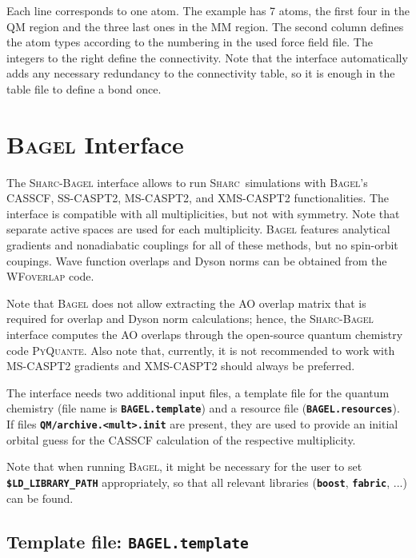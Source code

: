 \documentclass[a4paper,10pt,DIV=15,openany]{scrbook}
\newcommand{\tthdump}[1]{#1}
\newcommand{\sharc}{\textsc{Sharc}}
\newcommand{\ttt}[1]{\textbf{\texttt{#1}}}
\begin{document}
Each line corresponds to one atom.
The example has 7 atoms, the first four in the QM region and the three last ones in the MM region.
The second column defines the atom types according to the numbering in the used force field file.
The integers to the right define the connectivity. 
Note that the interface automatically adds any necessary redundancy to the connectivity table, so it is enough in the table file to define a bond once.







\tthdump{\FloatBarrier}
\section{\textsc{Bagel} Interface}\label{sec:int:bagel}

The \sharc-\textsc{Bagel} interface allows to run \sharc\ simulations with \textsc{Bagel}'s CASSCF, SS-CASPT2, MS-CASPT2, and XMS-CASPT2 functionalities.
The interface is compatible with all multiplicities, but not with symmetry.
Note that separate active spaces are used for each multiplicity.
\textsc{Bagel} features analytical gradients and nonadiabatic couplings for all of these methods, but no spin-orbit coupings.
Wave function overlaps and Dyson norms can be obtained from the \textsc{WFoverlap} code.

Note that \textsc{Bagel} does not allow extracting the AO overlap matrix that is required for overlap and Dyson norm calculations; hence, the \sharc-\textsc{Bagel} interface computes the AO overlaps through the open-source quantum chemistry code \textsc{PyQuante}.
Also note that, currently, it is not recommended to work with MS-CASPT2 gradients and XMS-CASPT2 should always be preferred.

The interface needs two additional input files, a template file for the quantum chemistry (file name is \ttt{BAGEL.template}) and a resource file (\ttt{BAGEL.resources}). 
If files \ttt{QM/archive.<mult>.init} are present, they are used to provide an initial orbital guess for the CASSCF calculation of the respective multiplicity.

Note that when running \textsc{Bagel}, it might be necessary for the user to set \ttt{\$LD\_LIBRARY\_PATH} appropriately, so that all relevant libraries (\ttt{boost}, \ttt{fabric}, ...) can be found.


\subsection{Template file: \ttt{BAGEL.template}}
\end{document}
